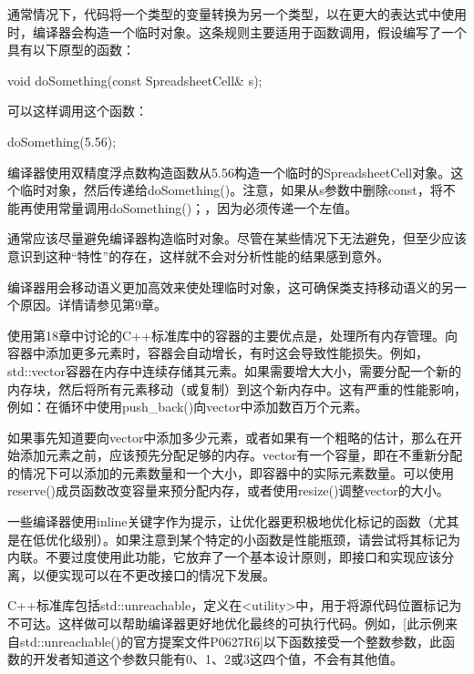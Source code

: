通常情况下，代码将一个类型的变量转换为另一个类型，以在更大的表达式中使用时，编译器会构造一个临时对象。这条规则主要适用于函数调用，假设编写了一个具有以下原型的函数：

\begin{cpp}
void doSomething(const SpreadsheetCell& s);
\end{cpp}

可以这样调用这个函数：

\begin{cpp}
doSomething(5.56);
\end{cpp}

编译器使用双精度浮点数构造函数从5.56构造一个临时的SpreadsheetCell对象。这个临时对象，然后传递给doSomething()。注意，如果从s参数中删除const，将不能再使用常量调用doSomething()；，因为必须传递一个左值。

通常应该尽量避免编译器构造临时对象。尽管在某些情况下无法避免，但至少应该意识到这种“特性”的存在，这样就不会对分析性能的结果感到意外。

编译器用会移动语义更加高效来使处理临时对象，这可确保类支持移动语义的另一个原因。详情请参见第9章。


使用第18章中讨论的C++标准库中的容器的主要优点是，处理所有内存管理。向容器中添加更多元素时，容器会自动增长，有时这会导致性能损失。例如，std::vector容器在内存中连续存储其元素。如果需要增大大小，需要分配一个新的内存块，然后将所有元素移动（或复制）到这个新内存中。这有严重的性能影响，例如：在循环中使用push\_back()向vector中添加数百万个元素。

如果事先知道要向vector中添加多少元素，或者如果有一个粗略的估计，那么在开始添加元素之前，应该预先分配足够的内存。vector有一个容量，即在不重新分配的情况下可以添加的元素数量和一个大小，即容器中的实际元素数量。可以使用reserve()成员函数改变容量来预分配内存，或者使用resize()调整vector的大小。


一些编译器使用inline关键字作为提示，让优化器更积极地优化标记的函数（尤其是在低优化级别）。如果注意到某个特定的小函数是性能瓶颈，请尝试将其标记为内联。不要过度使用此功能，它放弃了一个基本设计原则，即接口和实现应该分离，以便实现可以在不更改接口的情况下发展。



C++标准库包括std::unreachable，定义在<utility>中，用于将源代码位置标记为不可达。这样做可以帮助编译器更好地优化最终的可执行代码。例如，[此示例来自std::unreachable()的官方提案文件P0627R6]以下函数接受一个整数参数，此函数的开发者知道这个参数只能有0、1、2或3这四个值，不会有其他值。

